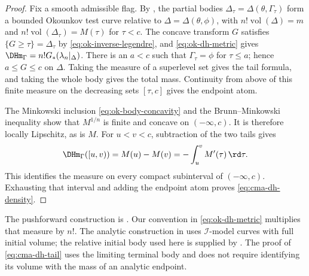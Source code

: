 \begin{proof}
Fix a smooth admissible flag. By , the
partial bodies $\Delta_\tau=\Delta(\theta,\Gamma_\tau)$ form a bounded
Okounkov test curve relative to $\Delta=\Delta(\theta,\phi)$, with
$n!\operatorname{vol}(\Delta)=m$ and
$n!\operatorname{vol}(\Delta_\tau)=M(\tau)$ for $\tau<c$.
The concave transform $G$ satisfies
$\{G\geq\tau\}=\Delta_\tau$ by \eqref{eq:ok-inverse-legendre}, and
\eqref{eq:ok-dh-metric} gives
$\DHm_\Gamma=n!G_*(\lambda_n|_\Delta)$.
There is an $a<c$ such that $\Gamma_\tau=\phi$ for $\tau\leq a$;
hence $a\leq G\leq c$ on $\Delta$. Taking the measure of a superlevel
set gives the tail formula, and taking the whole body gives the total
mass. Continuity from above of this finite measure on the decreasing
sets $[\tau,c]$ gives the endpoint atom.

The Minkowski inclusion \eqref{eq:ok-body-concavity} and the
Brunn--Minkowski inequality show that $M^{1/n}$ is finite and concave on
$(-\infty,c)$. It is therefore locally Lipschitz, as is $M$.
For $u<v<c$, subtraction of the two tails gives
\[
 \DHm_\Gamma([u,v))=M(u)-M(v)
                  =-\int_u^v M'(\tau)\,\rd\tau.
\]
This identifies the measure on every compact subinterval of
$(-\infty,c)$. Exhausting that interval and adding the endpoint atom
proves \eqref{eq:cma-dh-density}.
\end{proof}

The pushforward construction is \cite[Definition~7.6, p.~1329]{Xia21}.
Our convention in \eqref{eq:ok-dh-metric} multiplies that measure by
$n!$. The analytic construction in \cite[Lemma~7.7 and Definition~7.8,
pp.~1329--1330]{Xia21} uses $\mathcal I$-model curves with full initial
volume; the relative initial body used here is supplied by
. The proof of
\eqref{eq:cma-dh-tail} uses the limiting terminal body and does not
require identifying its volume with the mass of an analytic endpoint.

